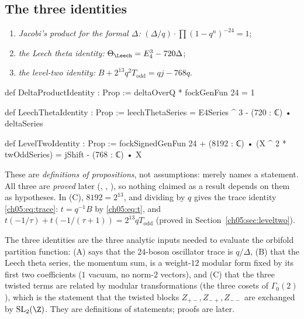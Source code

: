 \subsection{The three identities}

\begin{definition}\label{ch05:def:three}
\begin{enumerate}[label=(\Alph*)]
  \item \emph{Jacobi's product for the formal $\Delta$:} $(\Delta/q)\cdot\prod(1-q^n)^{-24} = 1$;
  \item \emph{the Leech theta identity:} $\Theta_\Leech = E_4^3 - 720\Delta$;
  \item \emph{the level-two identity:} $B + 2^{13}q^2T_{\mathrm{odd}} = qj - 768q$.
\end{enumerate}
\end{definition}
\begin{leancode}
def DeltaProductIdentity : Prop := deltaOverQ * fockGenFun 24 = 1

def LeechThetaIdentity : Prop :=
  leechThetaSeries = E4Series ^ 3 - (720 : ℂ) • deltaSeries

def LevelTwoIdentity : Prop :=
  fockSignedGenFun 24 + (8192 : ℂ) • (X ^ 2 * twOddSeries) = jShift - (768 : ℂ) • X
\end{leancode}
\begin{dictionary}
These are \emph{definitions of propositions}, not assumptions:  merely names a
statement. All three are \emph{proved} later (, ,
), so nothing claimed as a result depends on them as hypotheses. In (C),
$8192 = 2^{13}$, and dividing by $q$ gives the trace identity \eqref{ch05:eq:trace}: $t = q^{-1}B$
by \eqref{ch05:eq:t}, and $t(-1/\tau) + t(-1/(\tau+1)) = 2^{13}qT_{\mathrm{odd}}$ (proved in
Section~\ref{ch05:sec:leveltwo}).
\end{dictionary}

\begin{physics}
The three identities are the three analytic inputs needed to evaluate the orbifold partition function: (A) says that the $24$-boson oscillator trace is $q/\Delta$, (B) that the Leech theta series, the momentum sum, is a weight-$12$ modular form fixed by its first two coefficients ($1$ vacuum, no norm-$2$ vectors), and (C) that the three twisted terms are related by modular transformations (the three cosets of $\Gamma_0(2)$), which is the statement that the twisted blocks $Z_{+-},Z_{-+},Z_{--}$ are exchanged by $\mathrm{SL}_2(\Z)$. They are definitions of statements; proofs are later.
\end{physics}


